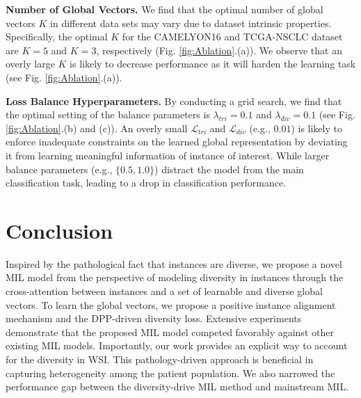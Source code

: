 \documentclass[runningheads]{llncs}
\begin{document}
\noindent\textbf{Number of Global Vectors.} We find that the optimal number of global vectors $K$ in different data sets may vary due to dataset intrinsic properties. 
Specifically, the optimal $K$ for the CAMELYON16 and TCGA-NSCLC dataset are $K=5$ and $K=3$, respectively (Fig. \ref{fig:Ablation}.(a)). 
We observe that an overly large $K$ is likely to decrease performance as it will harden the learning task (see Fig. \ref{fig:Ablation}.(a)). 

\noindent\textbf{Loss Balance Hyperparameters.} 
By conducting a grid search, we find that the optimal setting of the balance parameters is $\lambda_{tri} = 0.1$ and $\lambda_{div} = 0.1$ (see Fig. \ref{fig:Ablation}.(b) and (c)). An overly small $\mathcal{L}_{tri}$ and $\mathcal{L}_{div}$  (e.g., $0.01$) is likely to enforce inadequate constraints on the learned global representation by deviating it from learning meaningful information of instance of interest. While larger balance parameters (e.g., $\{0.5, 1.0\}$) distract the model from the main classification task, leading to a drop in classification performance. 

\section{Conclusion}
Inspired by the pathological fact that instances are diverse, we propose a novel MIL model from the perspective of modeling diversity in instances through the cross-attention between instances and a set of learnable and diverse global vectors. To learn the global vectors, we propose a positive instance alignment mechanism and the DPP-driven diversity loss. Extensive experiments demonstrate that the proposed MIL model competed favorably against other existing MIL models. Importantly, our work provides an explicit way to account for the diversity in WSI. This pathology-driven approach is beneficial in capturing heterogeneity among the patient population. We also narrowed the performance gap between the diversity-drive MIL method and mainstream MIL.

\end{document}
